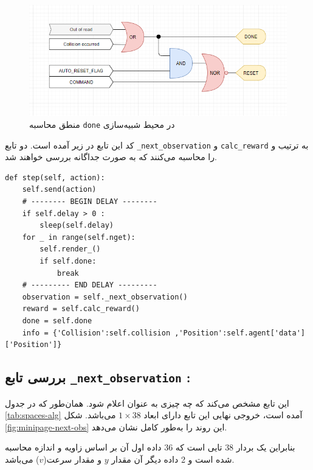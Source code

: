 \begin{figure}
	\centering
	\includegraphics[width=0.7\linewidth]{Figures/done-reset-logical}
	\caption{منطق محاسبه \texttt{done} در محیط شبیه‌سازی}
	\label{fig:done-step-logical}
\end{figure}




کد این تابع در زیر آمده است. دو تابع \texttt{\_next\_observation} و \texttt{calc\_reward} به ترتیب  و  را محاسبه می‌کنند که به صورت جداگانه بررسی خواهند شد.

\begin{latin}
\begin{lstlisting}
def step(self, action):	
	self.send(action)
	# -------- BEGIN DELAY --------
	if self.delay > 0 :
		sleep(self.delay)
	for _ in range(self.nget):
		self.render_()
		if self.done:
			break
	# --------- END DELAY -‌--------
	observation = self._next_observation()
	reward = self.calc_reward()
	done = self.done
	info = {'Collision':self.collision ,'Position':self.agent['data']['Position']}
\end{lstlisting}
\end{latin}

\subsection{بررسی تابع \textbf{\texttt{\_next\_observation} :}}
این تابع مشخص می‌کند که چه چیزی به عنوان  اعلام شود. همان‌طور که در جدول \ref{tab:spaces-alg} آمده است، خروجی نهایی این تابع دارای ابعاد $1\!\times\!38$ می‌باشد. شکل \ref{fig:minipage-next-obs} این روند را به‌طور کامل نشان ‌می‌دهد.

بنابراین  یک بردار 38 تایی است که 36 داده اول آن بر اساس زاویه و اندازه محاسبه شده است و 2 داده دیگر آن مقدار $y$ و مقدار سرعت($v$) می‌باشد.

